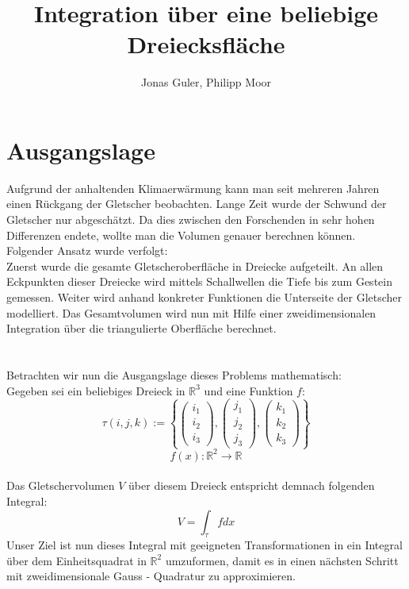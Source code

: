\documentclass[12pt]{article}
\begin{document}
\title{Integration über eine beliebige Dreiecksfläche}
\author{Jonas Guler, Philipp Moor}
\maketitle
\pagestyle{scrheadings}
\clearscrheadfoot
{}
\ofoot{\pagemark}

\newpage

\section{Ausgangslage}
Aufgrund der anhaltenden Klimaerwärmung kann man seit mehreren Jahren einen Rückgang der Gletscher beobachten. Lange Zeit wurde der Schwund der Gletscher nur abgeschätzt. Da dies zwischen den Forschenden in sehr hohen Differenzen endete, wollte man die Volumen genauer berechnen können. Folgender Ansatz wurde verfolgt:\\
Zuerst wurde die gesamte Gletscheroberfläche in Dreiecke aufgeteilt. An allen Eckpunkten dieser Dreiecke wird mittels Schallwellen die Tiefe bis zum Gestein gemessen. Weiter wird anhand konkreter Funktionen die Unterseite der Gletscher modelliert. Das Gesamtvolumen wird nun mit Hilfe einer zweidimensionalen Integration über die triangulierte Oberfläche berechnet. \\ \\ \\
Betrachten wir nun die Ausgangslage dieses Problems mathematisch: \\
Gegeben sei ein beliebiges Dreieck in $\mathbb{R}^3$ und eine Funktion $f$:
\[
\tau(i,j,k) :=
\left \{
		 \begin{pmatrix} i_1\\ i_2 \\ i_3 \end{pmatrix}
		 ,
		 \begin{pmatrix} j_1\\ j_2 \\ j_3 \end{pmatrix}
		 ,
		 \begin{pmatrix} k_1\\ k_2 \\ k_3 \end{pmatrix}
\right \}
\]
\[
   f(x) : \mathbb{R}^2 \rightarrow \mathbb{R}
\]
\\
Das Gletschervolumen $V$ über diesem Dreieck entspricht demnach folgenden Integral:
\[
V=\int_{\tau}fdx
\]
Unser Ziel ist nun dieses Integral mit geeigneten Transformationen in ein Integral über dem Einheitsquadrat in $\mathbb{R}^2$ umzuformen, damit es in einen nächsten Schritt mit zweidimensionale Gauss - Quadratur zu approximieren. \\
\\
\end{document}
